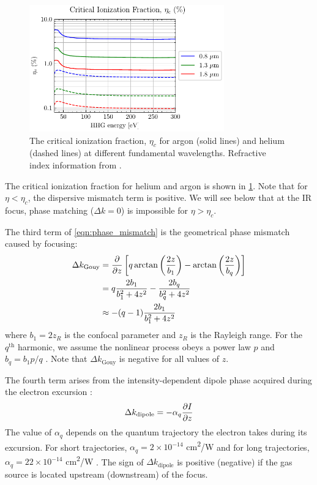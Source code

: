 \begin{figure}
	\centering
	\includegraphics[width=0.75\textwidth]{figures/chap1/crit_ion_frac.pdf}
	\caption{The critical ionization fraction, $\eta_c$ for argon (solid lines) and helium (dashed lines) at different fundamental wavelengths. Refractive index information from \cite{gulliksonCXROXRayInteractions,peckDispersionArgon1964,mansfieldDispersionHelium1969}.}
	\label{fig:crit_ion_frac}
\end{figure}

The critical ionization fraction for helium and argon is shown in \cref{fig:crit_ion_frac}. Note that for $\eta < \eta_c$, the dispersive mismatch term is positive. We will see below that at the IR focus, phase matching ($\Delta k = 0$) is impossible for $\eta > \eta_c$.

The third term of \cref{eqn:phase_mismatch} is the geometrical phase mismatch caused by focusing:
\begin{align}
\Delta k_{\textrm{Gouy}} &= \pdv{z} \left[ q \arctan\left( \frac{2 z}{b_1} \right) - \arctan \left( \frac{2 z}{b_q} \right) \right] \nonumber \\
&= q \frac{2 b_1}{b_1^2 + 4 z^2} - \frac{2 b_q}{b_q^2 + 4 z^2} \nonumber \\
&\approx -(q-1) \frac{2 b_1}{b_1^2 + 4 z^2}
\end{align}
where $b_1 = 2 z_R$ is the confocal parameter and $z_R$ is the Rayleigh range. For the $q^{\textrm{th}}$ harmonic, we assume the nonlinear process obeys a power law $p$ and $b_q = b_1 p /q$ \cite{schounAttosecondHighHarmonicSpectroscopy2015}. Note that $\Delta k_{\textrm{Gouy}}$ is negative for all values of $z$.

The fourth term arises from the intensity-dependent dipole phase acquired during the electron excursion \cite{lewensteinTheoryHighharmonicGeneration1994,balcouGeneralizedPhasematchingConditions1997,salieresCoherenceControlHighOrder1995}:
\begin{equation}
\Delta k_{\textrm{dipole}} = - \alpha_q \pdv{I}{z}
\label{eqn:deltak_atomic}
\end{equation}
The value of $\alpha_q$ depends on the quantum trajectory the electron takes during its excursion. For short trajectories, {$\alpha_q = 2 \times 10^{-14}$ cm\textsuperscript{2}/W} and for long trajectories, {$\alpha_q = 22 \times 10^{-14}$ cm\textsuperscript{2}/W} \cite{kazamiasPressureinducedPhaseMatching2011,balcouQuantumpathAnalysisPhase1999}. The sign of $\Delta k_{\textrm{dipole}}$ is positive (negative) if the gas source is located upstream (downstream) of the focus.

